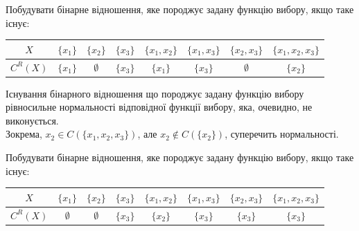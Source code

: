 \newpage

\begin{problem*}[класна]
    Побудувати бінарне відношення, яке породжує задану функцію вибору, якщо таке існує:
    \begin{table}[H]
        \centering
        \begin{tabular}{|c|c|c|c|c|c|c|c|}
            \hline
            $X$ & $\{x_1\}$ & $\{x_2\}$ & $\{x_3\}$ & $\{x_1, x_2\}$ & $\{x_1, x_3\}$ & $\{x_2, x_3\}$ & $\{x_1, x_2, x_3\}$ \\ \hline
            $C^R(X)$ & $\{x_1\}$ & $\emptyset$ & $\{x_3\}$ & $\{x_1\}$ & $\{x_3\}$ & $\emptyset$ & $\{x_2\}$ \\ \hline
        \end{tabular}
    \end{table}
\end{problem*}

\begin{solution}
    Існування бінарного відношення що породжує задану функцію вибору рівносильне нормальності відповідної функції вибору, яка, очевидно, не виконується. \\
    
    Зокрема, $x_2 \in C(\{x_1, x_2, x_3\})$, але $x_2 \notin C(\{x_2\})$, суперечить нормальності.
\end{solution}

\begin{problem}
    Побудувати бінарне відношення, яке породжує задану функцію вибору, якщо таке існує:
    \begin{table}[H]
        \centering
        \begin{tabular}{|c|c|c|c|c|c|c|c|}
            \hline
            $X$ & $\{x_1\}$ & $\{x_2\}$ & $\{x_3\}$ & $\{x_1, x_2\}$ & $\{x_1, x_3\}$ & $\{x_2, x_3\}$ & $\{x_1, x_2, x_3\}$ \\ \hline
            $C^R(X)$ & $\emptyset$ & $\emptyset$ & $\{x_3\}$ & $\{x_2\}$ & $\{x_3\}$ & $\{x_3\}$ & $\{x_3\}$ \\ \hline
        \end{tabular}
    \end{table}
\end{problem}

